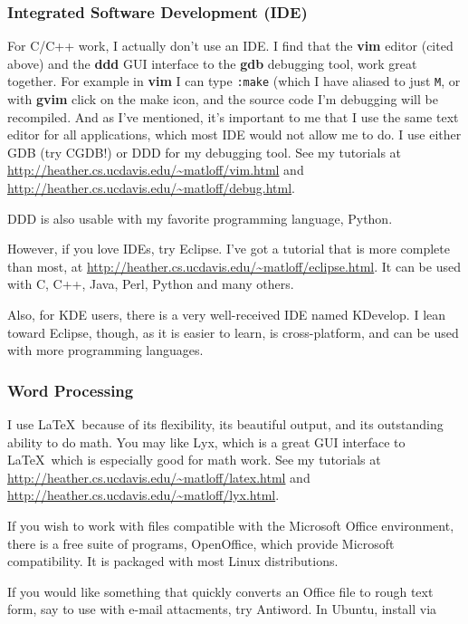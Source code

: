 \documentclass[11pt]{article}
\begin{document}
\subsubsection{Integrated Software Development (IDE)}

For C/C++ work, I actually don't use an IDE.  I find that the {\bf vim}
editor (cited above) and the {\bf ddd} GUI interface to the {\bf gdb}
debugging tool, work great together.  For example in {\bf vim} I can
type {\tt :make} (which I have aliased to just {\tt M}, or with {\bf
gvim} click on the make icon, and the source code I'm debugging will be
recompiled.  And as I've mentioned, it's important to me that I use the
same text editor for all applications, which most IDE would not allow me
to do.  I use either GDB (try CGDB!) or DDD for my debugging tool.  See
my tutorials at \url{http://heather.cs.ucdavis.edu/~matloff/vim.html}
and \url{http://heather.cs.ucdavis.edu/~matloff/debug.html}. 

DDD is also usable with my favorite programming language, Python.

However, if you love IDEs, try Eclipse.  I've got a tutorial that is
more complete than most, at
\url{http://heather.cs.ucdavis.edu/~matloff/eclipse.html}.   It can be
used with C, C++, Java, Perl, Python and many others.

Also, for KDE users, there is a very well-received IDE named KDevelop.
I lean toward Eclipse, though, as it is easier to learn, is
cross-platform, and can be used with more programming languages. 

\subsubsection{Word Processing}

I use \LaTeX\, because of its flexibility, its beautiful output, and its
outstanding ability to do math. You may like Lyx, which is a great
GUI interface to \LaTeX\ which is especially good for math work.
See my tutorials at
\url{http://heather.cs.ucdavis.edu/~matloff/latex.html} and
\url{http://heather.cs.ucdavis.edu/~matloff/lyx.html}. 

If you wish to work with files compatible with the Microsoft Office
environment, there is a free suite of programs, OpenOffice, which
provide Microsoft compatibility.  It is packaged with most Linux
distributions.

If you would like something that quickly converts an Office file to
rough text form, say to use with e-mail attacments, try Antiword.
In Ubuntu, install via
\end{document}
